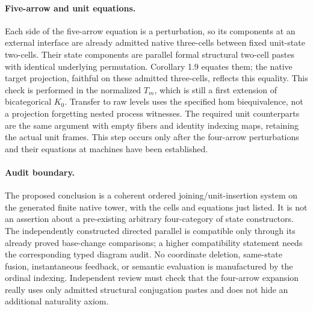 \documentclass{article}
\begin{document}
\paragraph{Five-arrow and unit equations.} Each side of the five-arrow equation is a perturbation, so its components at an external interface are already admitted native three-cells between fixed unit-state two-cells. Their state components are parallel formal structural two-cell pastes with identical underlying permutation. Corollary 1.9 equates them; the native target projection, faithful on these admitted three-cells, reflects this equality. This check is performed in the normalized $T_m$, which is still a first extension of bicategorical $K_0$. Transfer to raw levels uses the specified hom biequivalence, not a projection forgetting nested process witnesses. The required unit counterparts are the same argument with empty fibers and identity indexing maps, retaining the actual unit frames. This step occurs only after the four-arrow perturbations and their equations at machines have been established.

\paragraph{Audit boundary.} The proposed conclusion is a coherent ordered joining/unit-insertion system on the generated finite native tower, with the cells and equations just listed. It is not an assertion about a pre-existing arbitrary four-category of state constructors. The independently constructed directed parallel is compatible only through its already proved base-change comparisons; a higher compatibility statement needs the corresponding typed diagram audit. No coordinate deletion, same-state fusion, instantaneous feedback, or semantic evaluation is manufactured by the ordinal indexing. Independent review must check that the four-arrow expansion really uses only admitted structural conjugation pastes and does not hide an additional naturality axiom.
\end{document}
